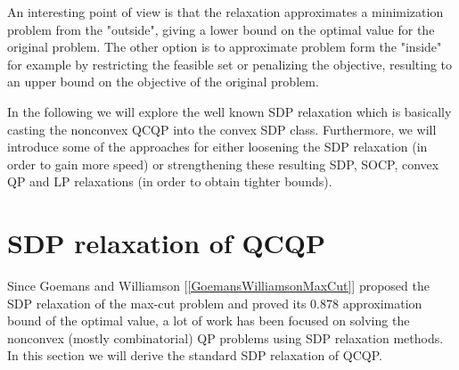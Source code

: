 \documentclass[12pt]{book}
\theoremstyle{definition}
\begin{document}
An interesting point of view is that the relaxation approximates a minimization problem from the "outside", 
giving a lower bound on the optimal value for the original problem. The other option is to approximate problem form the "inside" for example by restricting the feasible set or penalizing the objective, resulting to an upper bound on the objective of the original problem. %
%
%
%
%
%
%

In the following we will explore the well known SDP relaxation which is basically casting the nonconvex QCQP into the convex SDP class.
Furthermore, we will introduce some of the approaches for either loosening the SDP 	relaxation (in order to gain more speed) or strengthening these resulting SDP, SOCP, convex QP and LP relaxations (in order to obtain tighter bounds).



\section{SDP relaxation of QCQP}
\label{SectionSDPRelax}

Since Goemans and Williamson [\ref{GoemansWilliamsonMaxCut}] proposed the SDP relaxation of the max-cut problem and proved its 0.878 approximation bound of the optimal value, a lot of work has been focused on solving the nonconvex (mostly combinatorial) QP problems using SDP relaxation methods. In this section we will derive the standard SDP relaxation of QCQP. 
\end{document}
